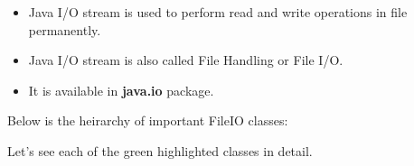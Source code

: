\setlength{\columnsep}{3pt}
\begin{flushleft}
	
	\begin{itemize}
		\item Java I/O stream is used to perform read and write operations in file permanently. 
		\item Java I/O stream is also called File Handling or File I/O. 
		\item It is available in \textbf{java.io} package.
	\end{itemize}

	
	\newpage
	
	Below is the heirarchy of important FileIO classes:
	

	Let's see each of the green highlighted classes in detail.
	
\end{flushleft}


